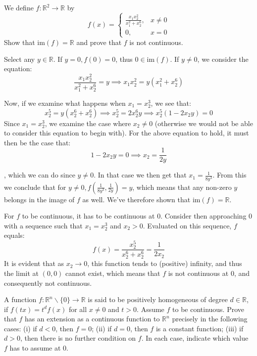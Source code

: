 \begin{exercise}{10}
    We define $f: \mathbb{R}^2 \rightarrow \mathbb{R}$ by
    $$f(x) = \left\{\begin{array}{ll}
         \frac{x_1 x_2^2}{x_1^2+x_2^6}, & x \neq 0 \\
         0, & x = 0
    \end{array}\right.$$
Show that $\text{im}(f) = \mathbb{R}$ and prove that $f$ is not continuous.
\end{exercise}

\begin{solution}

    Select any $y \in \mathbb{R}$. If $y = 0, f(0) = 0$, thus $0 \in \text{im}(f)$. If $y \neq 0$, we consider the equation:
    $$\frac{x_1 x_2^2}{x_1^2 + x_2^6} = y \implies x_1 x_2^2 = y(x_1^2 + x_2^6)$$

    Now, if we examine what happens when $x_1 = x_2^3$, we see that:
    $$x_2^5 = y(x_2^6 + x_2^6) \implies x_2^5 = 2x_2^6y \implies x_2^5(1 - 2x_2y) = 0$$
    Since $x_1=x_2^3$, we examine the case where $x_2 \neq 0$ (otherwise we would not be able to consider this equation to begin with). For the above equation to hold, it must then be the case that:
    $$1 -2x_2y = 0 \implies x_2 = \frac{1}{2y}$$

    , which we can do since $y \neq 0$. In that case we then get that $x_1 = \frac{1}{8y^3}$. From this we conclude that for $y \neq 0, f(\frac{1}{8y^3}, \frac{1}{2y}) = y$, which means that any non-zero $y$ belongs in the image of $f$ as well. We've therefore shown that $\text{im}(f) = \mathbb{R}$.

    For $f$ to be continuous, it has to be continuous at $0$. Consider then approaching 0 with a sequence such that $x_1 = x_2^3$ and $x_2 > 0$. Evaluated on this sequence, $f$ equals:
    $$f(x) = \frac{x_2^5}{x_2^6 + x_2^6} = \frac{1}{2x_2}$$
    It is evident that as $x_2 \rightarrow 0$, this function tends to (positive) infinity, and thus the limit at $(0, 0)$ cannot exist, which means that $f$ is not continuous at 0, and consequently not continuous.
\end{solution}

\begin{exercise}{11}
    A function $f: \mathbb{R}^n \backslash \{0\} \rightarrow \mathbb{R}$ is said to be positively homogeneous of degree $d \in \mathbb{R}$, if $f(tx) = t^df(x)$ for all $x \neq 0$ and $t > 0$. Assume $f$ to be continuous. Prove that $f$ has an extension as a continuous function to $\mathbb{R}^n$ precisely in the following cases: (i) if $d < 0$, then $f = 0$; (ii) if $d = 0$, then $f$ is a constant function; (iii) if $d > 0$, then there is no further condition on $f$. In each case, indicate which value $f$ has to assume at 0.
\end{exercise}

